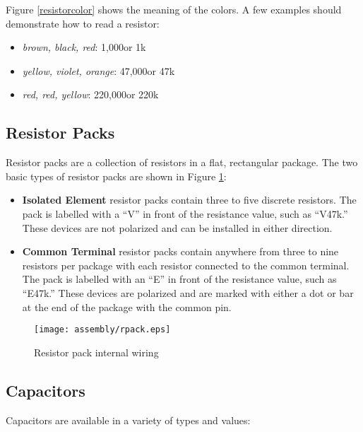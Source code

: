 Figure \ref{resistorcolor} shows the meaning of the colors. A few
examples should demonstrate how to read a resistor:
\begin{itemize}
 \item {\it brown, black, red}: 1,000\ohm or 1k\ohm
 \item {\it yellow, violet, orange}: 47,000\ohm or 47k\ohm
 \item {\it red, red, yellow}: 220,000\ohm or 220k\ohm
\end{itemize}

\subsection{Resistor Packs}

Resistor packs are a collection of resistors in a flat, rectangular
package. The two basic types of resistor packs are shown in Figure
\ref{rpack}:

\begin{itemize}

 \item {\bf Isolated Element} resistor packs contain three to five
 discrete resistors. The pack is labelled with a ``V'' in front of the
 resistance value, such as ``V47k\ohm.'' These devices are not polarized
 and can be installed in either direction.

 \item {\bf Common Terminal} resistor packs contain anywhere from
 three to nine resistors per package with each resistor connected to
 the common terminal. The pack is labelled with an ``E'' in front of the
 resistance value, such as ``E47k\ohm.'' These devices are polarized and
 are marked with either a dot or bar at the end of the package with
 the common pin.

\end{itemize}

\begin{figure}[htbp]
\begin{center}
\texttt{[image: assembly/rpack.eps]}
\caption{Resistor pack internal wiring}
\label{rpack}
\end{center}
\end{figure}

\subsection{Capacitors}

Capacitors are available in a variety of types and values:

